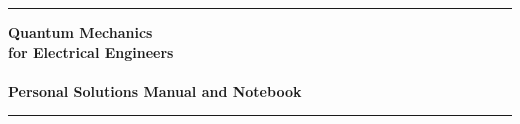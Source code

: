 \newcommand{\HRule}{\rule{\linewidth}{0.5mm}}


\begin{titlepage}

\begin{center}

\vfill{}

\HRule
{
	\Huge
	\bfseries
	Quantum Mechanics \\ for Electrical Engineers
	\\ ~ \\
	\large
	Personal Solutions Manual and Notebook
}
\HRule

\vfill{}

\end{center}

\end{titlepage}
